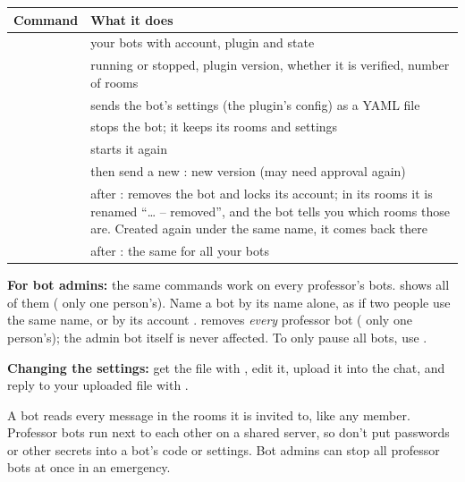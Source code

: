 \begin{center}
\begin{tabularx}{\textwidth}{@{}lL@{}}
\toprule
\textbf{Command} & \textbf{What it does} \\
\midrule
{} & your bots with account, plugin and state \\
 & running or stopped, plugin version, whether it is verified, number of rooms \\
 & sends the bot's settings (the plugin's config) as a YAML file \\
 & stops the bot; it keeps its rooms and settings \\
 & starts it again \\
 & then send a new : new version (may need approval again) \\
 & after : removes the bot and locks its account; in its rooms it is renamed \enquote{\dots{} -- removed}, and the bot tells you which rooms those are. Created again under the same name, it comes back there \\
 & after : the same for all your bots \\
\bottomrule
\end{tabularx}
\end{center}

\textbf{For bot admins:} the same commands work on every professor's bots. 
shows all of them ( only one person's). Name a bot by its name
alone, as  if two people use the same name, or by its account
.  removes \emph{every} professor bot
( only one person's); the admin bot itself is never
affected. To only pause all bots, use .

\textbf{Changing the settings:} get the file with , edit it, upload
it into the chat, and reply to your uploaded file with .

\begin{warning}
A bot reads every message in the rooms it is invited to, like any member. Professor bots
run next to each other on a shared server, so don't put passwords or other secrets into a
bot's code or settings. Bot admins can stop all professor bots at once in an emergency.
\end{warning}
